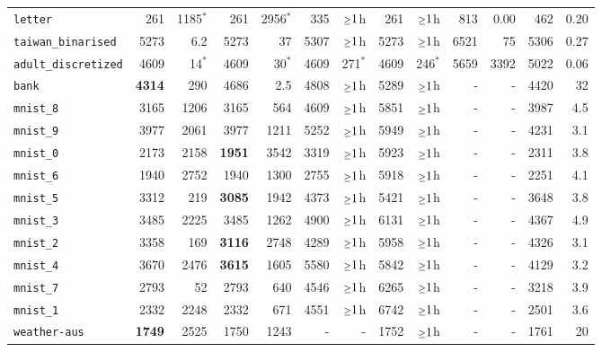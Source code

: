 \begin{tabular}{lrrrrrrrrrrrr}
\texttt{letter} & 261 & 1185$^*$ & 261 & 2956$^*$ & 335 & $\mathsmaller{\geq}1$h & 261 & $\mathsmaller{\geq}1$h & 813 & 0.00 & 462 & 0.20\\
\texttt{taiwan\_binarised} & 5273 & 6.2 & 5273 & 37 & 5307 & $\mathsmaller{\geq}1$h & 5273 & $\mathsmaller{\geq}1$h & 6521 & 75 & 5306 & 0.27\\
\texttt{adult\_discretized} & 4609 & 14$^*$ & 4609 & 30$^*$ & 4609 & 271$^*$ & 4609 & 246$^*$ & 5659 & 3392 & 5022 & 0.06\\
\texttt{bank} & \textbf{4314} & 290 & 4686 & 2.5 & 4808 & $\mathsmaller{\geq}1$h & 5289 & $\mathsmaller{\geq}1$h & - & - & 4420 & 32\\
\texttt{mnist\_8} & 3165 & 1206 & 3165 & 564 & 4609 & $\mathsmaller{\geq}1$h & 5851 & $\mathsmaller{\geq}1$h & - & - & 3987 & 4.5\\
\texttt{mnist\_9} & 3977 & 2061 & 3977 & 1211 & 5252 & $\mathsmaller{\geq}1$h & 5949 & $\mathsmaller{\geq}1$h & - & - & 4231 & 3.1\\
\texttt{mnist\_0} & 2173 & 2158 & \textbf{1951} & 3542 & 3319 & $\mathsmaller{\geq}1$h & 5923 & $\mathsmaller{\geq}1$h & - & - & 2311 & 3.8\\
\texttt{mnist\_6} & 1940 & 2752 & 1940 & 1300 & 2755 & $\mathsmaller{\geq}1$h & 5918 & $\mathsmaller{\geq}1$h & - & - & 2251 & 4.1\\
\texttt{mnist\_5} & 3312 & 219 & \textbf{3085} & 1942 & 4373 & $\mathsmaller{\geq}1$h & 5421 & $\mathsmaller{\geq}1$h & - & - & 3648 & 3.8\\
\texttt{mnist\_3} & 3485 & 2225 & 3485 & 1262 & 4900 & $\mathsmaller{\geq}1$h & 6131 & $\mathsmaller{\geq}1$h & - & - & 4367 & 4.9\\
\texttt{mnist\_2} & 3358 & 169 & \textbf{3116} & 2748 & 4289 & $\mathsmaller{\geq}1$h & 5958 & $\mathsmaller{\geq}1$h & - & - & 4326 & 3.1\\
\texttt{mnist\_4} & 3670 & 2476 & \textbf{3615} & 1605 & 5580 & $\mathsmaller{\geq}1$h & 5842 & $\mathsmaller{\geq}1$h & - & - & 4129 & 3.2\\
\texttt{mnist\_7} & 2793 & 52 & 2793 & 640 & 4546 & $\mathsmaller{\geq}1$h & 6265 & $\mathsmaller{\geq}1$h & - & - & 3218 & 3.9\\
\texttt{mnist\_1} & 2332 & 2248 & 2332 & 671 & 4551 & $\mathsmaller{\geq}1$h & 6742 & $\mathsmaller{\geq}1$h & - & - & 2501 & 3.6\\
\texttt{weather-aus} & \textbf{1749} & 2525 & 1750 & 1243 & - & - & 1752 & $\mathsmaller{\geq}1$h & - & - & 1761 & 20\\
\bottomrule
\end{tabular}
